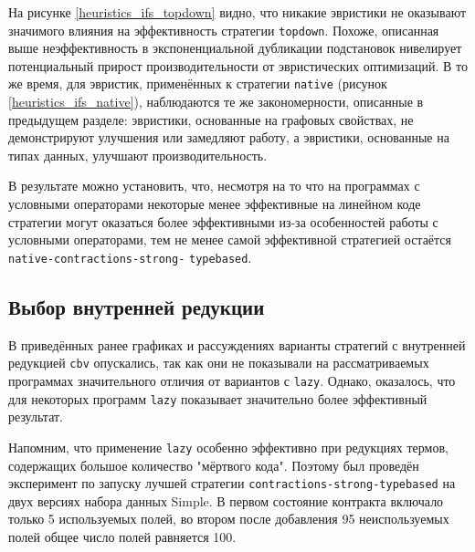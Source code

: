 \documentclass[../thesis.tex]{subfiles}
\begin{document}
На рисунке \ref{heuristics_ifs_topdown} видно, что никакие эвристики не оказывают значимого влияния на эффективность стратегии \texttt{topdown}. Похоже, описанная выше неэффективность в экспоненциальной дубликации подстановок нивелирует потенциальный прирост производительности от эвристических оптимизаций. В то же время, для эвристик, применённых к стратегии \texttt{native} (рисунок \ref{heuristics_ifs_native}), наблюдаются те же закономерности, описанные в предыдущем разделе: эвристики, основанные на графовых свойствах, не демонстрируют улучшения или замедляют работу, а эвристики, основанные на типах данных, улучшают производительность.

В результате можно установить, что, несмотря на то что на программах с условными операторами некоторые менее эффективные на линейном коде стратегии могут оказаться более эффективными из-за особенностей работы с условными операторами, тем не менее самой эффективной стратегией остаётся \texttt{native-contractions-strong-} \texttt{typebased}.

\subsection{Выбор внутренней редукции}\label{lazy_best}

В приведённых ранее графиках и рассуждениях варианты стратегий с внутренней редукцией \texttt{cbv} опускались, так как они не показывали на рассматриваемых программах значительного отличия от вариантов с \texttt{lazy}. Однако, оказалось, что для некоторых программ \texttt{lazy} показывает значительно более эффективный результат.

Напомним, что применение \texttt{lazy} особенно эффективно при редукциях термов, содержащих большое количество "мёртвого кода". Поэтому был проведён эксперимент по запуску лучшей стратегии \texttt{contractions-strong-typebased} на двух версиях набора данных Simple. В первом состояние контракта включало только 5 используемых полей, во втором после добавления 95 неиспользуемых полей общее число полей равняется 100. 
\end{document}

